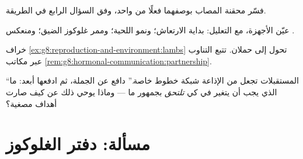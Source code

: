 \begin{exercise}[$\star\star$]\label{exo:g8:hormonal-communication:9}
فسّر محقنة المصاب   بوصفهما فعلًا
من  واحد، وفق السؤال الرابع في الطريقة.
\end{exercise}

\begin{exercise}[$\star\star$]\label{exo:g8:hormonal-communication:10}
عيّن الأجهزة، مع التعليل: بداية الارتعاش؛ ونمو اللحية؛
وممر غلوكوز  الضيق؛ ومنعكس .
\end{exercise}

\begin{exercise}[$\star\star$]\label{exo:g8:hormonal-communication:11}
خراف \cref{ex:g8:reproduction-and-environment:lambs}
تحول  إلى حملان. تتبع التناوب عبر مكاتب
\cref{rem:g8:hormonal-communication:partnership}.
\end{exercise}

\begin{exercise}[$\star\star\star$]\label{exo:g8:hormonal-communication:12}
``المستقبلات تجعل من الإذاعة شبكة خطوط خاصة.'' دافع عن
الجملة، ثم ادفعها أبعد: ما الذي يجب أن يتغير في  كي
\emph{تلتحق} بجمهور  ما --- وماذا يوحي ذلك عن كيف
صارت أهداف  مصغية؟
\end{exercise}

\section{مسألة: دفتر الغلوكوز}

